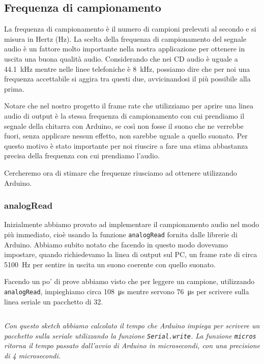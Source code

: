 \documentclass[a4paper,11pt]{article}
\newcommand\source[2]{
	\inputminted[fontsize=\footnotesize,linenos=true,tabsize=4]{#1}{#2}
}
\begin{document}
\subsection{Frequenza di campionamento}
La frequenza di campionamento è il numero di campioni prelevati al secondo e si misura in Hertz (\si{\hertz}).
La scelta della frequenza di campionamento del segnale audio è un fattore molto importante nella nostra applicazione per ottenere in uscita una buona qualità audio. Considerando che nei CD audio è uguale a \SI{44.1}{\kilo\hertz} mentre nelle linee telefoniche è \SI{8}{\kilo\hertz}, possiamo dire che per noi una frequenza accettabile si aggira tra questi due, avvicinandosi il più possibile alla prima.

Notare che nel nostro progetto il frame rate che utilizziamo per aprire una linea audio di output è la stessa frequenza di campionamento con cui prendiamo il segnale della chitarra con Arduino, se così non fosse il suono che ne verrebbe fuori, senza applicare nessun effetto, non sarebbe uguale a quello suonato. Per questo motivo è stato importante per noi riuscire a fare una stima abbastanza precisa della frequenza con cui prendiamo l'audio.

Cercheremo ora di stimare che frequenze riusciamo ad ottenere utilizzando Arduino.

\subsubsection{analogRead}
Inizialmente abbiamo provato ad implementare il campionamento audio nel modo più immediato, cioè usando la funzione \texttt{analogRead} fornita dalle librerie di Arduino. 
Abbiamo subito notato che facendo in questo modo dovevamo impostare, quando richiedevamo la linea di output sul PC, un frame rate di circa \SI{5100}{\hertz} per sentire in uscita un suono coerente con quello suonato.

Facendo un po' di prove abbiamo visto che per leggere un campione, utilizzando \texttt{analogRead}, impieghiamo circa \SI{108}{\micro\second} mentre servono \SI{76}{\micro\second} per scrivere sulla linea seriale un pacchetto di \SI{32}{\bit}. 

\source{cpp}{write_speed_rel}

\textit{Con questo sketch abbiamo calcolato il tempo che Arduino impiega per scrivere un pacchetto sulla seriale utilizzando la funzione \texttt{Serial.write}. La funzione \texttt{micros} ritorna il tempo passato dall'avvio di Arduino in microsecondi, con una precisione di 4 microsecondi.}
\vspace{0.2in}
\end{document}
